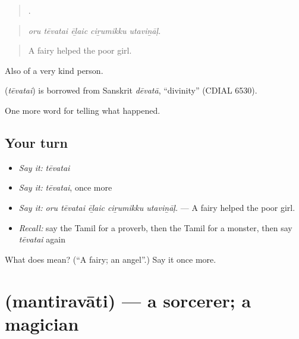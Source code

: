 \begin{quote}
    .
\end{quote}

\begin{quote}
\emph{oru tēvatai ēḻaic ciṟumikku utaviṉāḷ.}
\end{quote}

\begin{quote}
A fairy helped the poor girl.
\end{quote}

Also of a very kind person.

\begin{cousinweb}
\textbf{} (\emph{tēvatai}) is borrowed from Sanskrit \emph{dēvatā}, \textquotedblleft{}divinity\textquotedblright{} (CDIAL 6530).
\end{cousinweb}

\begin{grammarlens}[title={What you've built}]
One more word for telling what happened.
\end{grammarlens}

\subsection*{Your turn}
\begin{itemize}
\raggedright
  \item \emph{Say it:} \emph{tēvatai}
  \item \emph{Say it:} \emph{tēvatai}, once more
  \item \emph{Say it:} \emph{oru tēvatai ēḻaic ciṟumikku utaviṉāḷ.} — A fairy helped the poor girl.
  \item \emph{Recall:} say the Tamil for a proverb, then the Tamil for a monster, then say \emph{tēvatai} again
\end{itemize}

\begin{tcolorbox}[breakable,colback=teal!4,colframe=teal!35!black,title={Before you move on}]
What does  mean? (\textquotedblleft{}A fairy; an angel\textquotedblright{}.) Say it once more.
\end{tcolorbox}
\section[\texorpdfstring{\ta{மந்திரவாதி} (mantiravāti)}{மந்திரவாதி (mantiravāti)}]{ (mantiravāti) — a sorcerer; a magician}

